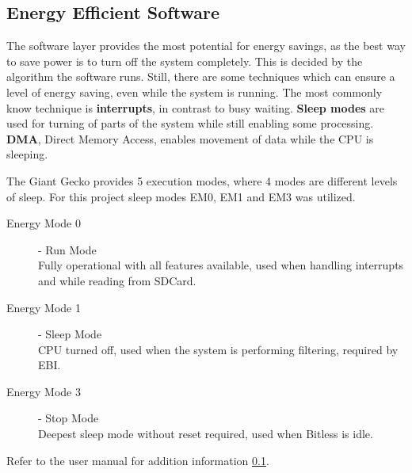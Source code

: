 \subsection{Energy Efficient Software}

The software layer provides the most potential for energy savings, as the best
way to save power is to turn off the system completely. This is decided by the
algorithm the software runs. Still, there are some techniques which can ensure
a level of energy saving, even while the system is running. The most commonly
know technique is {\bf interrupts}, in contrast to busy waiting. {\bf Sleep
modes} are used for turning of parts of the system while still enabling some
processing. {\bf DMA}, Direct Memory Access, enables movement of data while the
CPU is sleeping.

The Giant Gecko provides 5 execution modes, where 4 modes are different levels
of sleep. For this project sleep modes EM0, EM1 and EM3 was utilized.


\begin{description}
	\item[Energy Mode 0] - Run Mode \hfill \\
		Fully operational with all features available, used when handling
interrupts and while reading from SDCard.
	\item[Energy Mode 1] - Sleep Mode \hfill \\
		CPU turned off, used when the system is performing filtering, required
by EBI.
	\item[Energy Mode 3] - Stop Mode \hfill \\
		Deepest sleep mode without reset required, used when Bitless is idle.
\end{description}
Refer to the user manual for addition information \ref{}.
